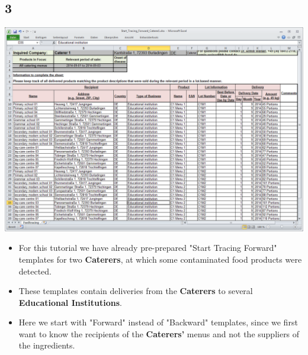 \documentclass{beamer}
\begin{document}
\subsection{3}
\begin{frame}
	\begin{center}
  		\includegraphics[height=0.5\textwidth]{3.png}
	\end{center}
	\begin{itemize}
		\item For this tutorial we have already pre-prepared "Start Tracing Forward" templates for two \textbf{Caterers}, at which some contaminated food products were detected.
		\item These templates contain deliveries from the \textbf{Caterers} to several \textbf{Educational Institutions}.
		\item Here we start with "Forward" instead of "Backward" templates, since we first want to know the recipients of the \textbf{Caterers'} menus and not the suppliers of the ingredients.
	\end{itemize}
\end{frame}
\end{document}

